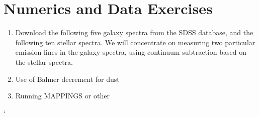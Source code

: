 \section{Numerics and Data Exercises}

\begin{enumerate}
\item Download the following five galaxy spectra from the SDSS
 database, and the following ten stellar spectra. We will concentrate
 on measuring two particular emission lines in the galaxy spectra,
 using continuum subtraction based on the stellar spectra.
\item Use of Balmer decrement for dust
\item Running MAPPINGS or other
\end{enumerate}`


  
